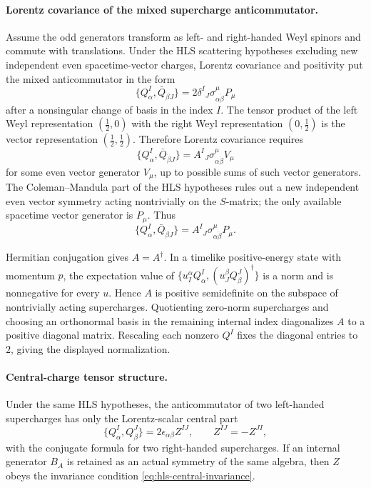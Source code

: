 \paragraph{Lorentz covariance of the mixed supercharge anticommutator.}
Assume the odd generators transform as left- and right-handed Weyl spinors
and commute with translations.  Under the HLS scattering hypotheses excluding
new independent even spacetime-vector charges, Lorentz covariance and
positivity put the mixed anticommutator in the form
\[
  \{Q^I_\alpha,\bar Q_{\dot\beta J}\}
  =
  2\delta^I{}_J\sigma^\mu_{\alpha\dot\beta}P_\mu
\]
after a nonsingular change of basis in the index \(I\).
The tensor product of the left Weyl representation \((\frac12,0)\) with the
right Weyl representation \((0,\frac12)\) is the vector representation
\((\frac12,\frac12)\).  Therefore Lorentz covariance requires
\[
  \{Q^I_\alpha,\bar Q_{\dot\beta J}\}
  =
  A^I{}_J\sigma^\mu_{\alpha\dot\beta}V_\mu
\]
for some even vector generator \(V_\mu\), up to possible sums of such vector
generators.  The Coleman--Mandula part of the HLS hypotheses rules out a new
independent even vector symmetry acting nontrivially on the \(S\)-matrix;
the only available spacetime vector generator is \(P_\mu\).  Thus
\[
  \{Q^I_\alpha,\bar Q_{\dot\beta J}\}
  =
  A^I{}_J\sigma^\mu_{\alpha\dot\beta}P_\mu .
\]

Hermitian conjugation gives \(A=A^\dagger\).  In a timelike positive-energy
state with momentum \(p\), the expectation value of
\(\{u_I^\alpha Q^I_\alpha,(u_J^\beta Q^J_\beta)^\dagger\}\) is a norm and is
nonnegative for every \(u\).  Hence \(A\) is positive semidefinite on the
subspace of nontrivially acting supercharges.  Quotienting zero-norm
supercharges and choosing an orthonormal basis in the remaining internal
index diagonalizes \(A\) to a positive diagonal matrix.  Rescaling each
nonzero \(Q^I\) fixes the diagonal entries to \(2\), giving the displayed
normalization.

\paragraph{Central-charge tensor structure.}
Under the same HLS hypotheses, the anticommutator of two left-handed
supercharges has only the Lorentz-scalar central part
\[
  \{Q^I_\alpha,Q^J_\beta\}
  =
  2\epsilon_{\alpha\beta}Z^{IJ},
  \qquad Z^{IJ}=-Z^{JI},
\]
with the conjugate formula for two right-handed supercharges.  If an internal
generator \(B_A\) is retained as an actual symmetry of the same algebra, then
\(Z\) obeys the invariance condition
\eqref{eq:hls-central-invariance}.

